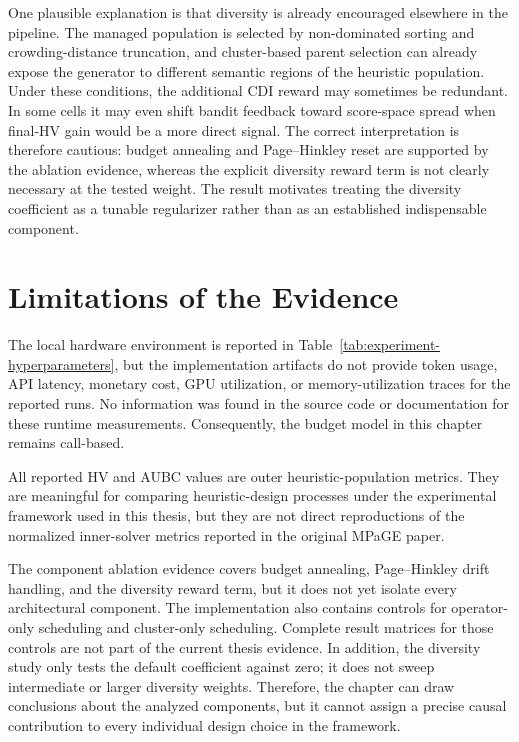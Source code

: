 One plausible explanation is that diversity is already encouraged elsewhere in the pipeline. The managed population is selected by non-dominated sorting and crowding-distance truncation, and cluster-based parent selection can already expose the generator to different semantic regions of the heuristic population. Under these conditions, the additional CDI reward may sometimes be redundant. In some cells it may even shift bandit feedback toward score-space spread when final-HV gain would be a more direct signal. The correct interpretation is therefore cautious: budget annealing and Page--Hinkley reset are supported by the ablation evidence, whereas the explicit diversity reward term is not clearly necessary at the tested weight. The result motivates treating the diversity coefficient as a tunable regularizer rather than as an established indispensable component.

\section*{Limitations of the Evidence}

The local hardware environment is reported in Table~\ref{tab:experiment-hyperparameters}, but the implementation artifacts do not provide token usage, API latency, monetary cost, GPU utilization, or memory-utilization traces for the reported runs. No information was found in the source code or documentation for these runtime measurements. Consequently, the budget model in this chapter remains call-based.

All reported HV and AUBC values are outer heuristic-population metrics. They are meaningful for comparing heuristic-design processes under the experimental framework used in this thesis, but they are not direct reproductions of the normalized inner-solver metrics reported in the original MPaGE paper.

The component ablation evidence covers budget annealing, Page--Hinkley drift handling, and the diversity reward term, but it does not yet isolate every architectural component. The implementation also contains controls for operator-only scheduling and cluster-only scheduling. Complete result matrices for those controls are not part of the current thesis evidence. In addition, the diversity study only tests the default coefficient against zero; it does not sweep intermediate or larger diversity weights. Therefore, the chapter can draw conclusions about the analyzed components, but it cannot assign a precise causal contribution to every individual design choice in the framework.

